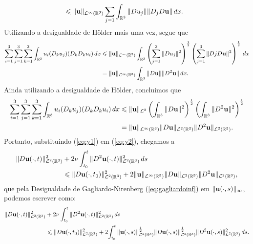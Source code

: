 \begin{prf}
\[\begin{aligned}
            &\leqslant \Vert \mathbf{u} \Vert_{\mathcal{L}^\infty(\mathbb{R}^3)} \sum_{j=1} \int_{\mathbb{R}^3} \Vert Du_j \Vert \Vert D_j D\mathbf{u} \Vert \,dx.
        \end{aligned}
    \]
    Utilizando a desigualdade de Hölder mais uma vez, segue que
    \[
        \begin{aligned}
            \sum_{i=1}^3\sum_{j=1}^3\sum_{k=1}^3 \int_{\mathbb{R}^3} u_i (D_k u_j)(D_k D_k u_i)\,dx &\leqslant \Vert \mathbf{u} \Vert_{\mathcal{L}^\infty(\mathbb{R}^3)}\int_{\mathbb{R}^3} \left( \sum_{j=1}^3 \Vert D u_j \Vert^2 \right)^{\frac{1}{2}} \left( \sum_{j=1}^{3} \Vert Dj D\mathbf{u} \Vert^2  \right)^{\frac{1}{2}} \,dx\\
            &=\Vert \mathbf{u} \Vert_{\mathcal{L}^\infty(\mathbb{R}^3)} \int_{\mathbb{R}^3} \Vert D\mathbf{u} \Vert \Vert D^2 \mathbf{u} \Vert \,dx.
        \end{aligned}
    \]
    Ainda utilizando a desigualdade de Hölder, concluimos que
    \begin{equation} \label{eq:y1}
        \begin{aligned}
            \sum_{i=1}^3\sum_{j=1}^3\sum_{k=1}^3 \int_{\mathbb{R}^3} u_i (D_k u_j)(D_k D_k u_i)\,dx &\leqslant \Vert \mathbf{u} \Vert_{\mathcal{L}^2} \left( \int_{\mathbb{R}^3} \Vert D\mathbf{u} \Vert^2 \right)^{\frac{1}{2}} \left( \int_{\mathbb{R}^3}  \Vert D^2\mathbf{u} \Vert^{2} \right)^{\frac{1}{2}}\\ 
            &= \Vert \mathbf{u} \Vert_{\mathcal{L}^\infty(\mathbb{R}^3)} \Vert D\mathbf{u} \Vert_{\mathcal{L}^2(\mathbb{R}^3)} \Vert D^2 \mathbf{u} \Vert_{\mathcal{L}^2(\mathbb{R}^3)}.
        \end{aligned}
    \end{equation}
    Portanto, substituindo (\ref{eq:y1}) em (\ref{eq:y2}), chegamos a
    \[
        \begin{aligned}
            \Vert D\mathbf{u}(\cdot,t) \Vert_{\mathcal{L}^2(\mathbb{R}^3)}^2 &+ 2\nu \int_{t_0}^t \Vert D^2 \mathbf{u}(\cdot,t) \Vert_{\mathcal{L}^2(\mathbb{R}^3)}^2 \,ds\\ &\leqslant \Vert D\mathbf{u}(\cdot,t_0) \Vert_{\mathcal{L}^2(\mathbb{R}^3)}^2 + 2 \Vert \mathbf{u} \Vert_{\mathcal{L}^\infty(\mathbb{R}^3)} \Vert D\mathbf{u} \Vert_{\mathcal{L}^2(\mathbb{R}^3)} \Vert D^2 \mathbf{u} \Vert_{\mathcal{L}^2(\mathbb{R}^3)},
        \end{aligned}
    \]
    que pela Desigualdade de Gagliardo-Nirenberg (\ref{eq:gagliardoinf}) em $\Vert \mathbf{u}(\cdot,s) \Vert_{\infty}$, podemos escrever como:
    \[
        \begin{aligned}
            \Vert D\bu(\cdot,t) \Vert_{\cL^2(\bR^3)}^2 &+ 2\nu \int_{t_0}^t \Vert D^2 \bu(\cdot,t) \Vert_{\cL^2(\bR^3)}^2 \,ds\\ &\leqslant \Vert D\bu(\cdot,t_0) \Vert_{\cL^2(\bR^3)}^2 + 2 \! \int_{t_0}^t \Vert \bu(\cdot,s) \Vert_{\cL^2(\bR^3)}^{\frac{1}{2}} \Vert D\bu(\cdot,s) \Vert_{\cL^2(\bR^3)}^{\frac{1}{2}} \Vert D^2\bu(\cdot,s) \Vert_{\cL^2(\bR^3)}^2 \,ds.

\end{aligned}\]
\end{prf}
